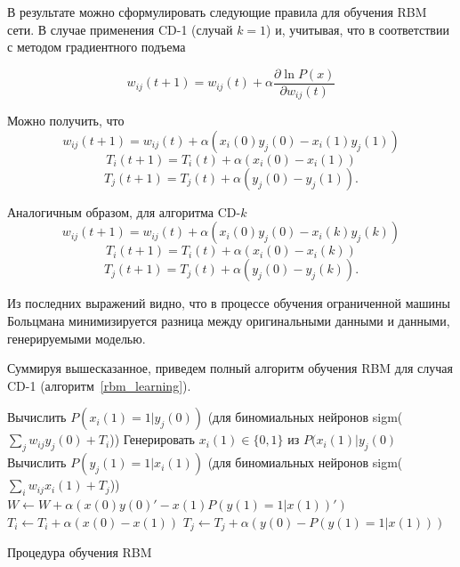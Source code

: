В результате можно сформулировать следующие правила для обучения RBM сети. В случае применения CD-1 (случай $k=1$) и, учитывая, что в соответствии с методом градиентного подъема

\begin{equation*}
	w_{ij}(t+1)=w_{ij}(t)+\alpha\frac{\partial \ln P(x)}{\partial w_{ij}(t)}
\end{equation*}	 

Можно получить, что
\begin{equation*}
	w_{ij}(t+1)=w_{ij}(t)+\alpha(x_i(0)y_j(0)-x_i(1)y_j(1))
\end{equation*}
\begin{equation*}		
	T_i(t+1)=T_i(t)+\alpha(x_i(0)-x_i(1))
\end{equation*}
\begin{equation*}		
	T_j(t+1)=T_j(t)+\alpha(y_j(0)-y_j(1)).
\end{equation*}		

Аналогичным образом, для алгоритма  CD-$k$
\begin{equation*}
	w_{ij}(t+1)=w_{ij}(t)+\alpha(x_i(0)y_j(0)-x_i(k)y_j(k))
\end{equation*} 
\begin{equation*}	
	T_i(t+1)=T_i(t)+\alpha(x_i(0)-x_i(k))
\end{equation*} 
\begin{equation*}		
	T_j(t+1)=T_j(t)+\alpha(y_j(0)-y_j(k)).
\end{equation*} 

Из последних выражений видно, что в процессе обучения ограниченной машины Больцмана минимизируется разница между оригинальными данными и данными, генерируемыми моделью.

Суммируя вышесказанное, приведем полный алгоритм обучения RBM для случая CD-1 (алгоритм~\ref{rbm_learning}).

\begin{algorithm}
	\SetAlgoLined
	
	{
		Вычислить $P(x_{i}(1)=1|y_j(0))$ (для биномиальных нейронов sigm($\sum_{j}{w_{ij}y_{j}(0)} + T_i$))\;
		Генерировать $x_{i}(1) \in \{0, 1\}$ из $P(x_{i}(1)|y_j(0)$\;
	}	
	{
		Вычислить $P(y_{j}(1)=1|x_i(1))$ (для биномиальных нейронов sigm($\sum_{i}{w_{ij}x_{i}(1)} + T_j$))\;
	}
	$W \leftarrow W + \alpha(x(0)y(0)' - x(1)P(y(1)=1|x(1))')$\;
	$T_i \leftarrow T_i + \alpha(x(0) - x(1))$\;
	$T_j \leftarrow T_j + \alpha(y(0) - P(y(1)=1|x(1)))$\;
	\caption{Процедура обучения RBM}
	\label{rbm_learning}
\end{algorithm}

